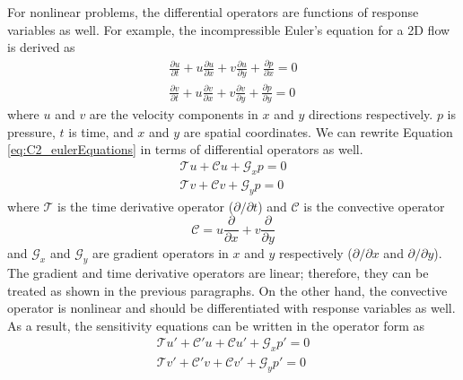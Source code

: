 For nonlinear problems, the differential operators are functions of response variables as well. For example, the incompressible Euler's equation for a 2D flow is derived as
%
\begin{subequations}\label{eq:C2_eulerEquations}
\begin{gather}
    \frac{\partial u}{\partial t} +
    u \frac{\partial u}{\partial x} + v \frac{\partial u}{\partial y} +
    \frac{\partial p}{\partial x} = 0 
    \\
    \frac{\partial v}{\partial t} +
    u \frac{\partial v}{\partial x} + v \frac{\partial v}{\partial y} +
    \frac{\partial p}{\partial y} = 0
\end{gather}
\end{subequations}
%
where $u$ and $v$ are the velocity components in $x$ and $y$ directions respectively. $p$ is pressure, $t$ is time, and $x$ and $y$ are spatial coordinates. We can rewrite Equation \eqref{eq:C2_eulerEquations} in terms of differential operators as well.
%
\begin{subequations}
\begin{gather*}
    \mathcal{T} u +
    \mathcal{C} u +
    \mathcal{G}_x p = 0 
    \\
    \mathcal{T} v +
    \mathcal{C} v +
    \mathcal{G}_y p = 0 
\end{gather*}
\end{subequations}
%
where $\mathcal{T}$ is the time derivative operator ($\partial /\partial t$) and $\mathcal{C}$ is the convective operator
%
\begin{equation}\label{eq:C2_convectiveOperator}
    \mathcal{C} = u \frac{\partial}{\partial x} + v \frac{\partial}{\partial y}
\end{equation}
%
and $\mathcal{G}_x$ and $\mathcal{G}_y$ are gradient operators in $x$ and $y$ respectively ($\partial /\partial x$ and $\partial /\partial y$). The gradient and time derivative operators are linear; therefore, they can be treated as shown in the previous paragraphs. On the other hand, the convective operator is nonlinear and should be differentiated with response variables as well. As a result, the sensitivity equations can be written in the operator form as
%
\begin{subequations}\label{eq:C2_eulerEquationsSA}
\begin{gather}
    \mathcal{T} u' +
    \mathcal{C}' u + \mathcal{C} u' +
    \mathcal{G}_x p' = 0 
    \\
    \mathcal{T} v' +
    \mathcal{C}' v + \mathcal{C} v' +
    \mathcal{G}_y p' = 0 
\end{gather}
\end{subequations}
